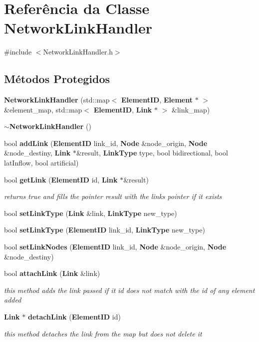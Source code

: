 \section{Referência da Classe Network\+Link\+Handler}
\label{class_network_link_handler}


{\ttfamily \#include $<$Network\+Link\+Handler.\+h$>$}

\subsection*{Métodos Protegidos}
\begin{DoxyCompactItemize}
\item 
{\bf Network\+Link\+Handler} (std\+::map$<$ {\bf Element\+ID}, {\bf Element} $\ast$ $>$ \&element\+\_\+map, std\+::map$<$ {\bf Element\+ID}, {\bf Link} $\ast$ $>$ \&link\+\_\+map)
\item 
{\bf $\sim$\+Network\+Link\+Handler} ()
\item 
bool {\bf add\+Link} ({\bf Element\+ID} link\+\_\+id, {\bf Node} \&node\+\_\+origin, {\bf Node} \&node\+\_\+destiny, {\bf Link} $\ast$\&result, {\bf Link\+Type} type, bool bidirectional, bool lat\+Inflow, bool artificial)
\item 
bool {\bf get\+Link} ({\bf Element\+ID} id, {\bf Link} $\ast$\&result)
\begin{DoxyCompactList}\small\item\em returns true and fills the pointer result with the link\textquotesingle{}s pointer if it exists \end{DoxyCompactList}\item 
bool {\bf set\+Link\+Type} ({\bf Link} \&link, {\bf Link\+Type} new\+\_\+type)
\item 
bool {\bf set\+Link\+Type} ({\bf Element\+ID} link\+\_\+id, {\bf Link\+Type} new\+\_\+type)
\item 
bool {\bf set\+Link\+Nodes} ({\bf Element\+ID} link\+\_\+id, {\bf Node} \&node\+\_\+origin, {\bf Node} \&node\+\_\+destiny)
\item 
bool {\bf attach\+Link} ({\bf Link} \&link)
\begin{DoxyCompactList}\small\item\em this method adds the link passed if it id does not match with the id of any element added \end{DoxyCompactList}\item 
{\bf Link} $\ast$ {\bf detach\+Link} ({\bf Element\+ID} id)
\begin{DoxyCompactList}\small\item\em this method detaches the link from the map but does not delete it \end{DoxyCompactList}\end{DoxyCompactItemize}
